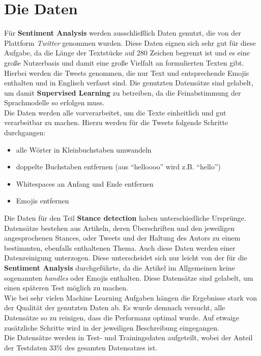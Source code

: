 \section{Die Daten}
F\"ur \textbf{Sentiment Analysis} werden ausschlie{\ss}lich Daten genutzt, die von der Plattform \textit{Twitter} genommen wurden. Diese Daten eignen sich sehr gut f\"ur diese Aufgabe, da die L\"ange der Textst\"ucke auf 280 Zeichen begrenzt ist \cite{twitter} und es eine gro{\ss}e Nutzerbasis und damit eine gro{\ss}e Vielfalt an formulierten Texten gibt. Hierbei werden die Tweets genommen, die nur Text und entsprechende Emojis enthalten und in Englisch verfasst sind. Die genutzten Datens\"atze sind gelabelt, um damit \textbf{Supervised Learning} zu betreiben, da die Feinabstimmung der Sprachmodelle so erfolgen muss.\\
Die Daten werden alle vorverarbeitet, um die Texte einheitlich und gut verarbeitbar zu machen. Hierzu werden f\"ur die Tweets folgende Schritte durchgangen:
\begin{itemize}
\item alle W\"orter in Kleinbuchstaben umwandeln
\item doppelte Buchstaben entfernen (aus "`helloooo"' wird z.B. "`hello"') 
\item Whitespaces an Anfang und Ende entfernen
\item Emojis entfernen
\end{itemize}
Die Daten f\"ur den Teil \textbf{Stance detection} haben unterschiedliche Urspr\"unge. Datens\"atze bestehen aus Artikeln, deren \"Uberschriften und den jeweiligen angesprochenen Stances, oder Tweets und der Haltung des Autors zu einem bestimmten, ebenfalls enthaltenen Thema. Auch diese Daten werden einer Datenreinigung unterzogen. Diese unterscheidet sich nur leicht von der f\"ur die \textbf{Sentiment Analysis} durchgef\"uhrte, da die Artikel im Allgemeinen keine sogenannten \textit{handles} oder Emojis enthalten. Diese Datens\"atze sind gelabelt, um einen sp\"ateren Test m\"oglich zu machen.\\
Wie bei sehr vielen Machine Learning Aufgaben h\"angen die Ergebnisse stark von der Qualit\"at der genutzten Daten ab. Es wurde demnach versucht, alle Datens\"atze so zu reinigen, dass die Performanz optimal wurde. Auf etwaige zus\"atzliche Schritte wird in der jeweiligen Beschreibung eingegangen.\\
Die Datens\"atze werden in Test- und Trainingsdaten aufgeteilt, wobei der Anteil der Testdaten 33\% des gesamten Datensatzes ist.

